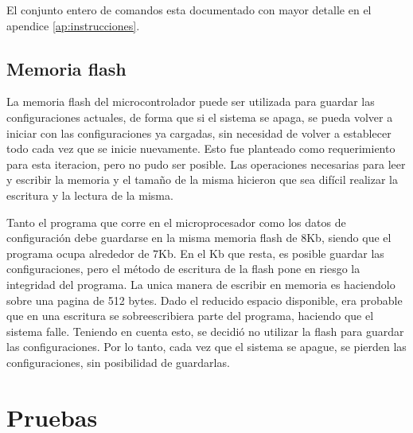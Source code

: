 El conjunto entero de comandos esta documentado con mayor detalle en el apendice \ref{ap:instrucciones}.

\subsection{Memoria flash} %
\label{it5:sub:memoria_flash}

La memoria flash del microcontrolador puede ser utilizada para guardar las configuraciones actuales, de forma que si el sistema se apaga, se pueda volver a iniciar con las configuraciones ya cargadas, sin necesidad de volver a establecer todo cada vez que se inicie nuevamente. Esto fue planteado como requerimiento para esta iteracion, pero no pudo ser posible. Las operaciones necesarias para leer y escribir la memoria y el tamaño de la misma hicieron que sea difícil realizar la escritura y la lectura de la misma.

Tanto el programa que corre en el microprocesador como los datos de configuración debe guardarse en la misma memoria flash de 8Kb, siendo que el programa ocupa alrededor de 7Kb. En el Kb que resta, es posible guardar las configuraciones, pero el método de escritura de la flash pone en riesgo la integridad del programa. La unica manera de escribir en memoria es haciendolo sobre una pagina de 512 bytes. Dado el reducido espacio disponible, era probable que en una escritura se sobreescribiera parte del programa, haciendo que el sistema falle.
Teniendo en cuenta esto, se decidió no utilizar la flash para guardar las configuraciones. Por lo tanto, cada vez que el sistema se apague, se pierden las configuraciones, sin posibilidad de guardarlas.



\section{Pruebas} %
\label{it5:sec:pruebas}

